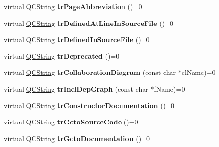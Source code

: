 \begin{DoxyCompactItemize}
\item 
\mbox{\label{class_translator_a800bf5724b6cff1053d43470090e2963}} 
virtual \mbox{\hyperlink{class_q_c_string}{Q\+C\+String}} {\bfseries tr\+Page\+Abbreviation} ()=0
\item 
\mbox{\label{class_translator_ade090183d43e3f6a3bcebf03a89ebdfd}} 
virtual \mbox{\hyperlink{class_q_c_string}{Q\+C\+String}} {\bfseries tr\+Defined\+At\+Line\+In\+Source\+File} ()=0
\item 
\mbox{\label{class_translator_a7107b47ae388237e48ccf1fc4c3b3f77}} 
virtual \mbox{\hyperlink{class_q_c_string}{Q\+C\+String}} {\bfseries tr\+Defined\+In\+Source\+File} ()=0
\item 
\mbox{\label{class_translator_aa03a2c19570b7e2ba76c4d7b70485cfc}} 
virtual \mbox{\hyperlink{class_q_c_string}{Q\+C\+String}} {\bfseries tr\+Deprecated} ()=0
\item 
\mbox{\label{class_translator_a5f811bad50bed217f91d14aa734d77b4}} 
virtual \mbox{\hyperlink{class_q_c_string}{Q\+C\+String}} {\bfseries tr\+Collaboration\+Diagram} (const char $\ast$cl\+Name)=0
\item 
\mbox{\label{class_translator_aa48bba9e5bb9b903cbf8cbd3bf26be00}} 
virtual \mbox{\hyperlink{class_q_c_string}{Q\+C\+String}} {\bfseries tr\+Incl\+Dep\+Graph} (const char $\ast$f\+Name)=0
\item 
\mbox{\label{class_translator_af0bb3238975bac96f454f69e9b940538}} 
virtual \mbox{\hyperlink{class_q_c_string}{Q\+C\+String}} {\bfseries tr\+Constructor\+Documentation} ()=0
\item 
\mbox{\label{class_translator_a32f89b2666555fc695a9f06f8d808570}} 
virtual \mbox{\hyperlink{class_q_c_string}{Q\+C\+String}} {\bfseries tr\+Goto\+Source\+Code} ()=0
\item 
\mbox{\label{class_translator_ad513407b6d899db23bf73ae8c05a2c3a}} 
virtual \mbox{\hyperlink{class_q_c_string}{Q\+C\+String}} {\bfseries tr\+Goto\+Documentation} ()=0
\item 

\end{DoxyCompactItemize}
